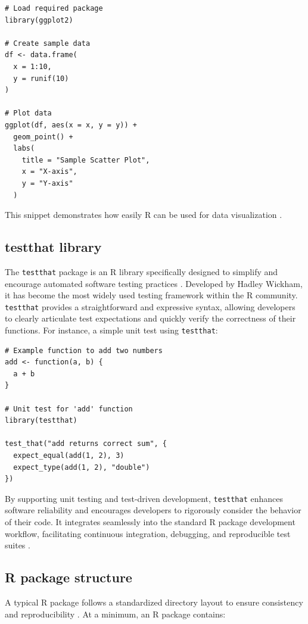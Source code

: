 \begin{verbatim}
# Load required package
library(ggplot2)

# Create sample data
df <- data.frame(
  x = 1:10,
  y = runif(10)
)

# Plot data
ggplot(df, aes(x = x, y = y)) +
  geom_point() +
  labs(
    title = "Sample Scatter Plot",
    x = "X-axis",
    y = "Y-axis"
  )
\end{verbatim}

This snippet demonstrates how easily R can be used for data visualization \cite{wickham2019r4ds}.

\subsection{testthat library}

The \texttt{testthat} package is an R library specifically designed to simplify and encourage automated software testing practices \cite{wickham2011testthat}. Developed by Hadley Wickham, it has become the most widely used testing framework within the R community. \texttt{testthat} provides a straightforward and expressive syntax, allowing developers to clearly articulate test expectations and quickly verify the correctness of their functions. For instance, a simple unit test using \texttt{testthat}:

\begin{verbatim}
# Example function to add two numbers
add <- function(a, b) {
  a + b
}

# Unit test for 'add' function
library(testthat)

test_that("add returns correct sum", {
  expect_equal(add(1, 2), 3)
  expect_type(add(1, 2), "double")
})
\end{verbatim}

By supporting unit testing and test-driven development, \texttt{testthat} enhances software reliability and encourages developers to rigorously consider the behavior of their code. It integrates seamlessly into the standard R package development workflow, facilitating continuous integration, debugging, and reproducible test suites \cite{wickham2015rpackages}.

\subsection{R package structure}

A typical R package follows a standardized directory layout to ensure consistency and reproducibility \cite{wickham2015rpackages}. At a minimum, an R package contains:

